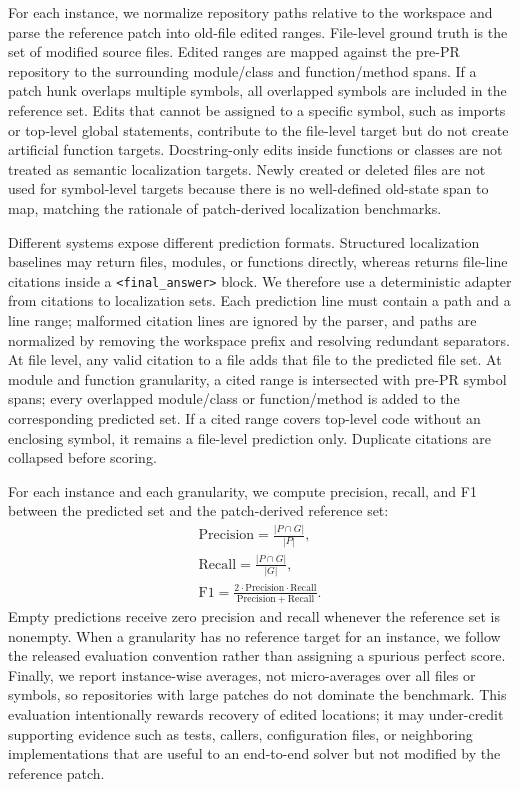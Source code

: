 

For each instance, we normalize repository paths relative to the workspace and parse the reference patch into old-file edited ranges.
File-level ground truth is the set of modified source files.
Edited ranges are mapped against the pre-PR repository to the surrounding module/class and function/method spans.
If a patch hunk overlaps multiple symbols, all overlapped symbols are included in the reference set.
Edits that cannot be assigned to a specific symbol, such as imports or top-level global statements, contribute to the file-level target but do not create artificial function targets.
Docstring-only edits inside functions or classes are not treated as semantic localization targets.
Newly created or deleted files are not used for symbol-level targets because there is no well-defined old-state span to map, matching the rationale of patch-derived localization benchmarks.

Different systems expose different prediction formats.
Structured localization baselines may return files, modules, or functions directly, whereas \approach returns file-line citations inside a \texttt{<final\_answer>} block.
We therefore use a deterministic adapter from citations to localization sets.
Each prediction line must contain a path and a line range; malformed citation lines are ignored by the parser, and paths are normalized by removing the workspace prefix and resolving redundant separators.
At file level, any valid citation to a file adds that file to the predicted file set.
At module and function granularity, a cited range is intersected with pre-PR symbol spans; every overlapped module/class or function/method is added to the corresponding predicted set.
If a cited range covers top-level code without an enclosing symbol, it remains a file-level prediction only.
Duplicate citations are collapsed before scoring.

For each instance and each granularity, we compute precision, recall, and F1 between the predicted set and the patch-derived reference set:
\begin{equation}
\begin{gathered}
\mathrm{Precision} = \frac{|P \cap G|}{|P|}, \\
\mathrm{Recall} = \frac{|P \cap G|}{|G|}, \\
\mathrm{F1} = \frac{2\cdot\mathrm{Precision}\cdot\mathrm{Recall}}{\mathrm{Precision}+\mathrm{Recall}}.
\end{gathered}
\end{equation}
Empty predictions receive zero precision and recall whenever the reference set is nonempty.
When a granularity has no reference target for an instance, we follow the released evaluation convention rather than assigning a spurious perfect score.
Finally, we report instance-wise averages, not micro-averages over all files or symbols, so repositories with large patches do not dominate the benchmark.
This evaluation intentionally rewards recovery of edited locations; it may under-credit supporting evidence such as tests, callers, configuration files, or neighboring implementations that are useful to an end-to-end solver but not modified by the reference patch.

